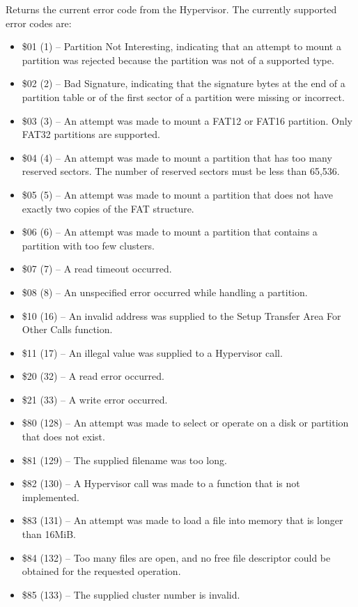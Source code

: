 Returns the current error code from the Hypervisor.  The currently supported
error codes are:

\begin{itemize}
\item \$01 (1) -- Partition Not Interesting, indicating that an attempt to mount a partition was rejected because the partition was not of a supported type.
\item \$02 (2) -- Bad Signature, indicating that the signature bytes at the end of a partition table or of the first sector of a partition were missing or incorrect.
\item \$03 (3) -- An attempt was made to mount a FAT12 or FAT16 partition.  Only FAT32 partitions are supported.
\item \$04 (4) -- An attempt was made to mount a partition that has too many reserved sectors. The number of reserved sectors must be less than 65,536.
  \item \$05 (5) -- An attempt was made to mount a partition that does not have exactly two copies of the FAT structure.
\item \$06 (6) -- An attempt was made to mount a partition that contains a partition with too few clusters.
\item \$07 (7) -- A read timeout occurred.
  \item \$08 (8) -- An unspecified error occurred while handling a partition.
\item \$10 (16) -- An invalid address was supplied to the Setup Transfer Area For Other Calls function.
\item \$11 (17) -- An illegal value was supplied to a Hypervisor call.
\item \$20 (32) -- A read error occurred.
\item \$21 (33) -- A write error occurred.
\item \$80 (128) -- An attempt was made to select or operate on a disk or partition that does not exist.
\item \$81 (129) -- The supplied filename was too long.
\item \$82 (130) -- A Hypervisor call was made to a function that is not implemented. 
\item \$83 (131) -- An attempt was made to load a file into memory that is longer than 16MiB.
\item \$84 (132) -- Too many files are open, and no free file descriptor could be obtained for the requested operation.
\item \$85 (133) -- The supplied cluster number is invalid.

\end{itemize}
